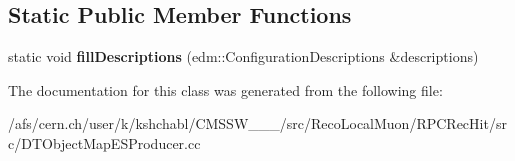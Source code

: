 \subsection*{Static Public Member Functions}
\begin{DoxyCompactItemize}
\item 
\hypertarget{classDTObjectMapESProducer_a31d4332c3cb3db260f28b28331b50e45}{static void {\bfseries fill\-Descriptions} (edm\-::\-Configuration\-Descriptions \&descriptions)}\label{classDTObjectMapESProducer_a31d4332c3cb3db260f28b28331b50e45}

\end{DoxyCompactItemize}


The documentation for this class was generated from the following file\-:\begin{DoxyCompactItemize}
\item 
/afs/cern.\-ch/user/k/kshchabl/\-C\-M\-S\-S\-W\-\_\-\_\-\_/src/\-Reco\-Local\-Muon/\-R\-P\-C\-Rec\-Hit/src/D\-T\-Object\-Map\-E\-S\-Producer.\-cc\end{DoxyCompactItemize}
